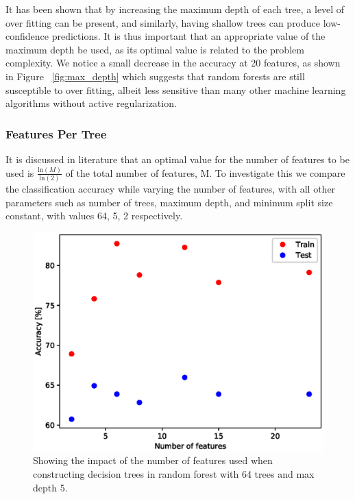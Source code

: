 \documentclass{article} %
\begin{document}
It has been shown that by increasing the maximum depth of each tree, a level of over fitting can be present, and similarly, having shallow trees can produce low-confidence predictions. \cite{Criminisi2011} It is thus important that an appropriate value of the maximum depth be used, as its optimal value is related to the problem complexity. We notice a small decrease in the accuracy at 20 features, as shown in Figure ~\ref{fig:max_depth} which suggests that random forests are still susceptible to over fitting, albeit less sensitive than many other machine learning algorithms without active regularization.

\subsubsection{Features Per Tree}

It is discussed in literature that an optimal value for the number of features to be used is $\frac{\text{ln}(M)}{\text{ln}(2)}$ of the total number of features, M. \cite{Brieman01} To investigate this we compare the classification accuracy while varying the number of features, with all other parameters such as number of trees, maximum depth, and minimum split size constant, with values 64, 5, 2 respectively.

\begin{figure}[ht]
\begin{center}
\includegraphics[scale=0.4]{n_features}
\end{center}
\caption{Showing the impact of the number of features used when constructing decision trees in random forest with 64 trees and max depth 5.}
\label{fig:n_features}
\end{figure}
\end{document}

